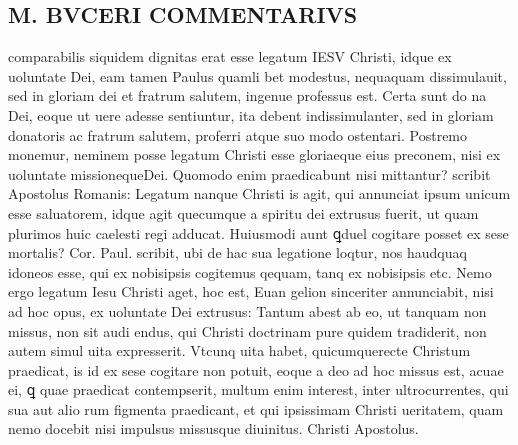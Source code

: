\documentclass{article}
\begin{document}
\begin{pages}
\section*{M. BVCERI COMMENTARIVS }
\marginpar{[ p.18 ]}\pstart comparabilis siquidem dignitas erat esse legatum IESV Christi, idque ex uoluntate Dei, eam tamen Paulus quamli bet modestus, nequaquam dissimulauit, sed in gloriam dei et fratrum salutem, ingenue professus est. Certa sunt do na Dei, eoque ut uere adesse sentiuntur, ita debent indissimulanter, sed in gloriam donatoris ac fratrum salutem, proferri atque suo modo ostentari.  Postremo monemur, neminem posse legatum Christi esse gloriaeque eius preconem, nisi ex uoluntate missionequeDei.  Quomodo enim praedicabunt nisi mittantur? scribit Apostolus Romanis: Legatum nanque Christi is agit, qui annunciat ipsum unicum esse saluatorem, idque agit quecumque a spiritu dei extrusus fuerit, ut quam plurimos huic caelesti regi adducat.  Huiusmodi aunt ꝗduel cogitare posset ex sese mortalis? Cor. Paul.  scribit, ubi de hac sua legatione loqtur, nos haudquaq idoneos esse, qui ex nobisipsis cogitemus qequam, tanq ex nobisipsis etc.  Nemo ergo legatum Iesu Christi aget, hoc est, Euan gelion sinceriter annunciabit, nisi ad hoc opus, ex uoluntate Dei extrusus:  \pend\pstart Tantum abest ab eo, ut tanquam non missus, non sit audi endus, qui Christi doctrinam pure quidem tradiderit, non autem simul uita expresserit. Vtcunq uita habet, quicumquerecte Christum praedicat, is id ex sese cogitare non potuit, eoque a deo ad hoc missus est, acuae ei, ꝗ quae praedicat contempserit, multum enim interest, inter ultrocurrentes, qui sua aut alio rum figmenta praedicant, et qui ipsissimam Christi ueritatem, quam nemo docebit nisi impulsus missusque diuinitus.   \pendQuis Christi Apostolus.  

\end{pages}
\end{document}
